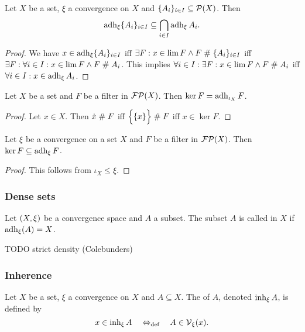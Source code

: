 \begin{lemma}
Let $X$ be a set, $\xi$ a convergence on $X$ and $\{A_i\}_{i\in I} \subseteq \operatorname{\mathcal{P}}(X)$. Then
\[ \operatorname{adh}_\xi \{A_i\}_{i\in I} \subseteq \bigcap_{i\in I}\operatorname{adh}_\xi A_i. \]
\end{lemma}
\begin{proof}
We have $x\in \operatorname{adh}_\xi \{A_i\}_{i\in I}$ iff $\exists F: x\in \lim F \land F\mathrel{\#} \{A_i\}_{i\in I}$ iff $\exists F: \forall i\in I: x\in \lim F \land F\mathrel{\#} A_i$. This implies $\forall i\in I: \exists F: x\in \lim F \land F\mathrel{\#} A_i$ iff $\forall i\in I: x\in \operatorname{adh}_\xi A_i$.
\end{proof}



\begin{lemma}
Let $X$ be a set and $F$ be a filter in $\operatorname{\mathcal{FP}}(X)$. Then $\ker F = \operatorname{adh}_{\iota_X} F$.
\end{lemma}
\begin{proof}
Let $x\in X$. Then $\dot{x} \mathrel{\#} F$ iff $\Big\{\{x\}\Big\} \mathrel{\#} F$ iff $x\in \ker F$.
\end{proof}
\begin{corollary}
Let $\xi$ be a convergence on a set $X$ and $F$ be a filter in $\operatorname{\mathcal{FP}}(X)$. Then $\ker F \subseteq \operatorname{adh}_\xi F$.
\end{corollary}
\begin{proof}
This follows from $\iota_X \leq \xi$.
\end{proof}

\subsubsection{Dense sets}
\begin{definition}
Let $\left( X, \xi \right)$ be a convergence space and $A$ a subset. The subset $A$ is called  in $X$ if $\operatorname{adh}_\xi(A) = X$.
\end{definition}
TODO strict density (Colebunders)

\subsubsection{Inherence}
\begin{definition}
Let $X$ be a set, $\xi$ a convergence on $X$ and $A \subseteq X$. The  of $A$, denoted $\operatorname{inh}_\xi A$, is defined by
\[ x\in \operatorname{inh}_\xi A \quad\Leftrightarrow_{\text{def}}\quad A\in \operatorname{\mathcal{V}}_\xi(x). \]
\end{definition}

